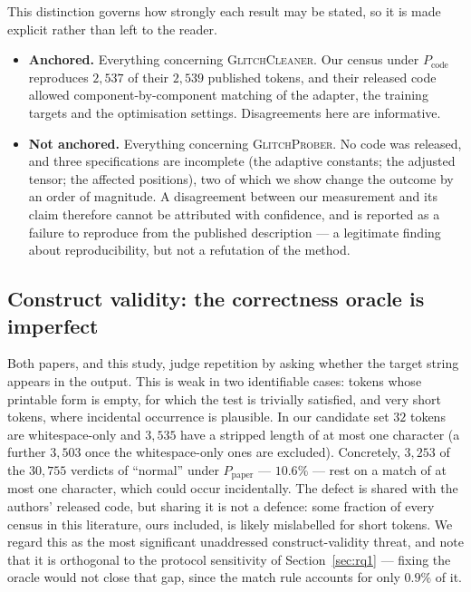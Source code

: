 \documentclass[11pt,a4paper]{article}
\newcommand{\gp}{\textsc{GlitchProber}}
\newcommand{\gc}{\textsc{GlitchCleaner}}
\newcommand{\Ppaper}{$P_{\mathrm{paper}}$}
\newcommand{\Pcode}{$P_{\mathrm{code}}$}
\begin{document}
This distinction governs how strongly each result may be stated, so it is made
explicit rather than left to the reader.

\begin{itemize}[leftmargin=*]
\item \textbf{Anchored.} Everything concerning \gc{}. Our census under \Pcode{}
reproduces $2{,}537$ of their $2{,}539$ published tokens, and their released code
allowed component-by-component matching of the adapter, the training targets and
the optimisation settings. Disagreements here are informative.
\item \textbf{Not anchored.} Everything concerning \gp{}. No code was released,
and three specifications are incomplete (the adaptive constants; the adjusted
tensor; the affected positions), two of which we show change the outcome by an
order of magnitude. A disagreement between our measurement and its claim therefore
cannot be attributed with confidence, and is reported as a failure to reproduce
from the published description --- a legitimate finding about reproducibility, but
not a refutation of the method.
\end{itemize}

\subsection{Construct validity: the correctness oracle is imperfect}

Both papers, and this study, judge repetition by asking whether the target string
appears in the output. This is weak in two identifiable cases: tokens whose
printable form is empty, for which the test is trivially satisfied, and very short
tokens, where incidental occurrence is plausible. In our candidate set $32$ tokens
are whitespace-only and $3{,}535$ have a stripped length of at most one character
(a further $3{,}503$ once the whitespace-only ones are excluded). Concretely,
$3{,}253$ of the $30{,}755$ verdicts of ``normal'' under \Ppaper{} --- $10.6\%$ ---
rest on a match of at most one character, which could occur incidentally.
The defect is shared with the authors' released code, but sharing it is not a
defence: some fraction of every census in this literature, ours included, is
likely mislabelled for short tokens. We regard this as the most significant
unaddressed construct-validity threat, and note that it is orthogonal to the
protocol sensitivity of Section~\ref{sec:rq1} --- fixing the oracle would not
close that gap, since the match rule accounts for only $0.9\%$ of it.
\end{document}
